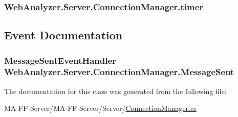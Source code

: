 \subsubsection[{timer}]{ Web\+Analyzer.\+Server.\+Connection\+Manager.\+timer\hspace{0.3cm}{\ttfamily [private]}}\label{class_web_analyzer_1_1_server_1_1_connection_manager_aa639f32d7193a808bd9680359b325887}


\subsection{Event Documentation}
\hypertarget{class_web_analyzer_1_1_server_1_1_connection_manager_a2eb5de18882e69a65b4b7ce3ee458af1}{}
\subsubsection[{Message\+Sent}]{\setlength{\rightskip}{0pt plus 5cm}Message\+Sent\+Event\+Handler Web\+Analyzer.\+Server.\+Connection\+Manager.\+Message\+Sent}\label{class_web_analyzer_1_1_server_1_1_connection_manager_a2eb5de18882e69a65b4b7ce3ee458af1}


The documentation for this class was generated from the following file\+:\begin{DoxyCompactItemize}
\item 
M\+A-\/\+F\+F-\/\+Server/\+M\+A-\/\+F\+F-\/\+Server/\+Server/\hyperlink{_connection_manager_8cs}{Connection\+Manager.\+cs}\end{DoxyCompactItemize}
